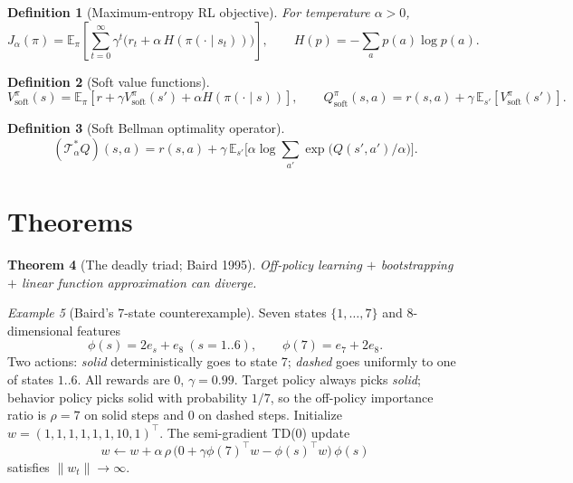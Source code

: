 \documentclass[11pt]{article}
\newtheorem{theorem}{Theorem}[section]
\newtheorem{definition}[theorem]{Definition}
\theoremstyle{remark}
\newtheorem{example}[theorem]{Example}
\begin{document}
\begin{definition}[Maximum-entropy RL objective]
For temperature $\alpha>0$,
\[
J_\alpha(\pi)=\mathbb{E}_\pi\!\left[\sum_{t=0}^{\infty}\gamma^t\big(r_t+\alpha\,H(\pi(\cdot\mid s_t))\big)\right],\qquad H(p)=-\sum_a p(a)\log p(a).
\]
\end{definition}

\begin{definition}[Soft value functions]
\[
V^\pi_{\mathrm{soft}}(s)=\mathbb{E}_\pi[r+\gamma V^\pi_{\mathrm{soft}}(s')+\alpha H(\pi(\cdot\mid s))],\qquad
Q^\pi_{\mathrm{soft}}(s,a)=r(s,a)+\gamma\,\mathbb{E}_{s'}[V^\pi_{\mathrm{soft}}(s')].
\]
\end{definition}

\begin{definition}[Soft Bellman optimality operator]
\[
(\mathcal{T}^*_\alpha Q)(s,a)=r(s,a)+\gamma\,\mathbb{E}_{s'}\!\Big[\alpha\log\!\sum_{a'}\exp\!\big(Q(s',a')/\alpha\big)\Big].
\]
\end{definition}

\section*{Theorems}

\begin{theorem}[The deadly triad; Baird 1995]
Off-policy learning $+$ bootstrapping $+$ linear function approximation can diverge.
\end{theorem}

\begin{example}[Baird's 7-state counterexample]
Seven states $\{1,\ldots,7\}$ and 8-dimensional features
\[
\phi(s)=2e_s+e_8\ (s=1..6),\qquad \phi(7)=e_7+2e_8.
\]
Two actions: \emph{solid} deterministically goes to state 7; \emph{dashed} goes uniformly to one of states $1..6$. All rewards are $0$, $\gamma=0.99$. Target policy always picks \emph{solid}; behavior policy picks solid with probability $1/7$, so the off-policy importance ratio is $\rho=7$ on solid steps and $0$ on dashed steps. Initialize $w=(1,1,1,1,1,1,10,1)^\top$. The semi-gradient TD(0) update
\[
w\leftarrow w+\alpha\,\rho\,\big(0+\gamma\phi(7)^\top w-\phi(s)^\top w\big)\,\phi(s)
\]
satisfies $\|w_t\|\to\infty$.
\end{example}
\end{document}
